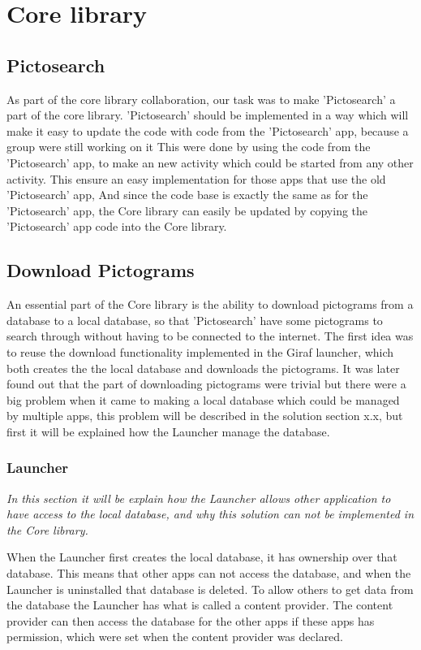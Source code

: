 \section{Core library}
\textit{}

\subsection{Pictosearch}
As part of the core library collaboration, our task was to make 'Pictosearch' a part of the core library. 'Pictosearch' should be implemented in a way which will make it easy to update the code with code from the 'Pictosearch' app, because a group were still working on it This were done by using the code from the 'Pictosearch' app, to make an new activity which could be started from any other activity. This ensure an easy implementation for those apps that use the old 'Pictosearch' app, And since the code base is exactly the same as for the 'Pictosearch' app, the Core library can easily be updated by copying the 'Pictosearch' app code into the Core library.


\subsection{Download Pictograms}
An essential part of the Core library is the ability to download pictograms from a database to a local database, so that 'Pictosearch' have some pictograms to search through without having to be connected to the internet. The first idea was to reuse the download functionality implemented in the Giraf launcher, which both creates the the local database and downloads the pictograms. It was later found out that the part of downloading pictograms were trivial but there were a big problem when it came to making a local database which could be managed by multiple apps, this problem will be described in the solution section x.x, but first it will be explained how the Launcher manage the database.

\subsubsection{Launcher}
\textit{In this section it will be explain how the Launcher allows other application to have access to the local database, and why this solution can not be implemented in the Core library.}


When the Launcher first creates the local database, it has ownership over that database. This means that other apps can not access the database, and when the Launcher is uninstalled that database is deleted. To allow others to get data from the database the Launcher has what is called a content provider. The content provider can then access the database for the other apps if these apps has permission, which were set when the content provider was declared.

